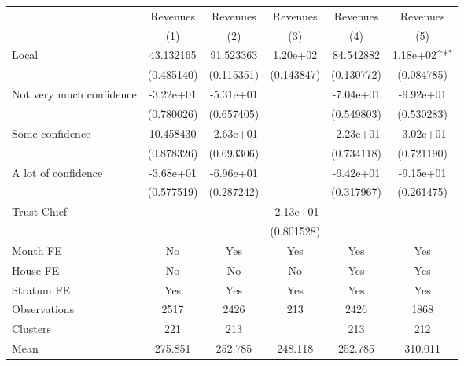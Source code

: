 {
\def\sym#1{\ifmmode^{#1}\else\(^{#1}\)\fi}
\begin{tabular}{l*{5}{c}}
\toprule
                &\multicolumn{1}{c}{Revenues}&\multicolumn{1}{c}{Revenues}&\multicolumn{1}{c}{Revenues}&\multicolumn{1}{c}{Revenues}&\multicolumn{1}{c}{Revenues}\\
                &\multicolumn{1}{c}{(1)}         &\multicolumn{1}{c}{(2)}         &\multicolumn{1}{c}{(3)}         &\multicolumn{1}{c}{(4)}         &\multicolumn{1}{c}{(5)}         \\
\midrule
Local           &43.132165         &91.523363         & 1.20e+02         &84.542882         & 1.18e+02\sym{*}  \\
                &(0.485140)         &(0.115351)         &(0.143847)         &(0.130772)         &(0.084785)         \\
Not very much confidence&-3.22e+01         &-5.31e+01         &                  &-7.04e+01         &-9.92e+01         \\
                &(0.780026)         &(0.657405)         &                  &(0.549803)         &(0.530283)         \\
Some confidence &10.458430         &-2.63e+01         &                  &-2.23e+01         &-3.02e+01         \\
                &(0.878326)         &(0.693306)         &                  &(0.734118)         &(0.721190)         \\
A lot of confidence&-3.68e+01         &-6.96e+01         &                  &-6.42e+01         &-9.15e+01         \\
                &(0.577519)         &(0.287242)         &                  &(0.317967)         &(0.261475)         \\
Trust Chief     &                  &                  &-2.13e+01         &                  &                  \\
                &                  &                  &(0.801528)         &                  &                  \\
Month FE        &       No         &      Yes         &      Yes         &      Yes         &      Yes         \\
House FE        &       No         &       No         &       No         &      Yes         &      Yes         \\
Stratum FE      &      Yes         &      Yes         &      Yes         &      Yes         &      Yes         \\
\midrule
Observations    &     2517         &     2426         &      213         &     2426         &     1868         \\
Clusters        &      221         &      213         &                  &      213         &      212         \\
Mean            &  275.851         &  252.785         &  248.118         &  252.785         &  310.011         \\
\bottomrule
\end{tabular}
}
